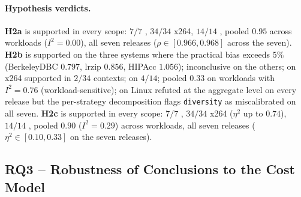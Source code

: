 
\paragraph*{Hypothesis verdicts.}
\textbf{H2a} is supported in every scope: $7/7$ \StudyReplication,
$34/34$ x264, $14/14$ \StudyEnergy, pooled $0.95$ across workloads
($I^{2}\!=\!0.00$), all seven \StudyLinux releases ($\rho\in[0.966, 0.968]$ across the seven).
\textbf{H2b} is supported on the three \StudyReplication systems where the
practical bias exceeds $5\%$ (BerkeleyDBC $0.797$, lrzip $0.856$,
HIPAcc $1.056$); inconclusive on the others; on x264 supported in
$2/34$ contexts; on \StudyEnergy $4/14$; pooled $0.33$ on workloads with
$I^{2}\!=\!0.76$ (workload-sensitive); on Linux refuted at the
aggregate level on every release but the per-strategy decomposition
flags \texttt{diversity} as miscalibrated on all seven.
\textbf{H2c} is supported in every scope: $7/7$ \StudyReplication, $34/34$
x264 ($\eta^{2}$ up to $0.74$), $14/14$ \StudyEnergy, pooled $0.90$
($I^{2}\!=\!0.29$) across workloads, all seven \StudyLinux releases
($\eta^{2}\!\in\![0.10, 0.33]$ on the seven releases).

\subsection{RQ3 -- Robustness of Conclusions to the Cost Model}
\label{subsec:results-rq3}

